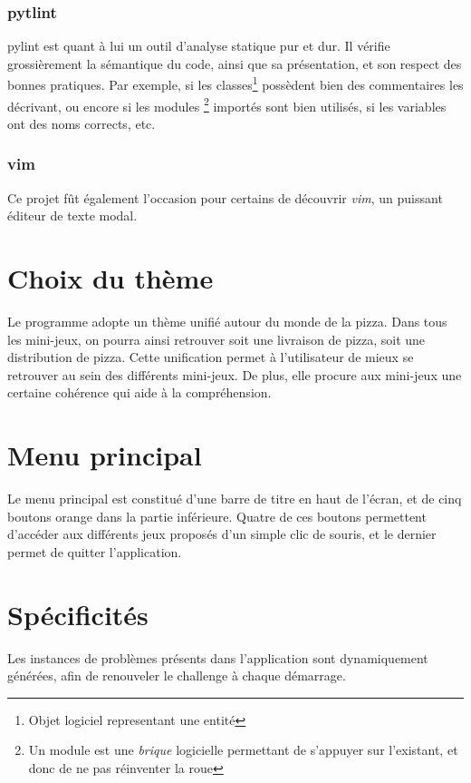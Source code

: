         \subsubsection{pytlint} pylint est quant à lui un outil d'analyse
            statique pur et dur. Il vérifie grossièrement la sémantique du code,
            ainsi que sa présentation, et son respect des bonnes pratiques.
            Par exemple, si les classes\footnote{Objet logiciel representant une entité}
            possèdent bien des commentaires les décrivant, ou encore si les modules
            \footnote{Un module est une \emph{brique} logicielle permettant
            de s'appuyer sur l'existant, et donc de ne pas réinventer la roue}
            importés sont bien utilisés, si les variables ont des noms corrects, etc.
        \subsubsection{vim}
            Ce projet fût également l'occasion pour certains de découvrir \emph{vim},
            un puissant éditeur de texte modal.

\section{Choix du thème}
    Le programme adopte un thème unifié autour du monde de la pizza. Dans tous les mini-jeux, on pourra
    ainsi retrouver soit une livraison de pizza, soit une distribution de pizza. Cette unification permet à
    l'utilisateur de mieux se retrouver au sein des différents mini-jeux. De plus, elle procure aux mini-jeux
    une certaine cohérence qui aide à la compréhension.

\section{Menu principal}
	Le menu principal est constitué d'une barre de titre en haut de l'écran, et de cinq boutons orange
	 dans la partie inférieure. Quatre de ces boutons permettent d'accéder aux différents jeux proposés
	 d'un simple clic de souris, et le dernier permet de quitter l'application.

\section{Spécificités} %
    Les instances de problèmes présents dans l'application
    sont dynamiquement générées, afin de renouveler
    le challenge à chaque démarrage.
